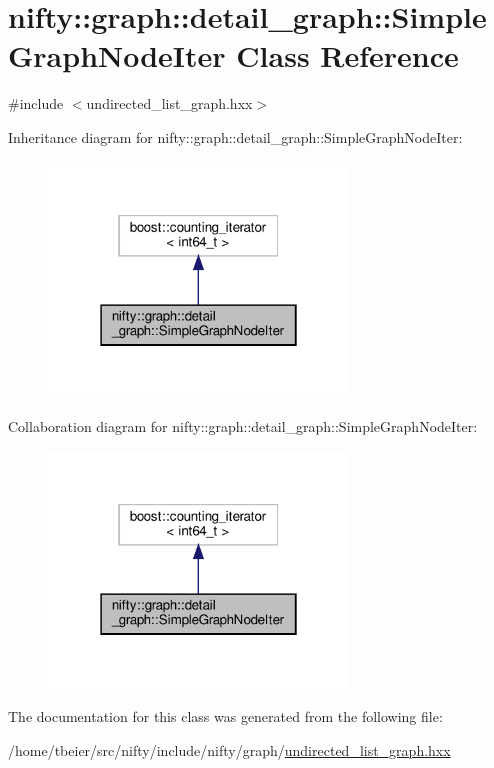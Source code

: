 \hypertarget{classnifty_1_1graph_1_1detail__graph_1_1SimpleGraphNodeIter}{}\section{nifty\+:\+:graph\+:\+:detail\+\_\+graph\+:\+:Simple\+Graph\+Node\+Iter Class Reference}
\label{classnifty_1_1graph_1_1detail__graph_1_1SimpleGraphNodeIter}


{\ttfamily \#include $<$undirected\+\_\+list\+\_\+graph.\+hxx$>$}



Inheritance diagram for nifty\+:\+:graph\+:\+:detail\+\_\+graph\+:\+:Simple\+Graph\+Node\+Iter\+:
\nopagebreak
\begin{figure}[H]
\begin{center}
\leavevmode
\includegraphics[width=226pt]{classnifty_1_1graph_1_1detail__graph_1_1SimpleGraphNodeIter__inherit__graph}
\end{center}
\end{figure}


Collaboration diagram for nifty\+:\+:graph\+:\+:detail\+\_\+graph\+:\+:Simple\+Graph\+Node\+Iter\+:
\nopagebreak
\begin{figure}[H]
\begin{center}
\leavevmode
\includegraphics[width=226pt]{classnifty_1_1graph_1_1detail__graph_1_1SimpleGraphNodeIter__coll__graph}
\end{center}
\end{figure}


The documentation for this class was generated from the following file\+:\begin{DoxyCompactItemize}
\item 
/home/tbeier/src/nifty/include/nifty/graph/\hyperlink{graph_2undirected__list__graph_8hxx}{undirected\+\_\+list\+\_\+graph.\+hxx}\end{DoxyCompactItemize}
